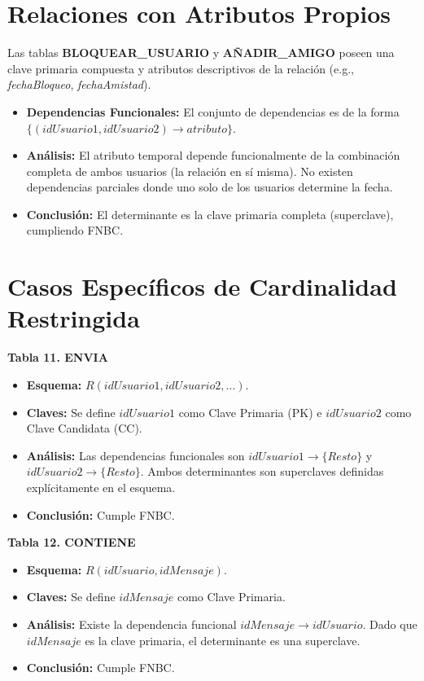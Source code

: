 \section*{Relaciones con Atributos Propios}
Las tablas \textbf{BLOQUEAR\_USUARIO} y \textbf{AÑADIR\_AMIGO} poseen una clave primaria compuesta y atributos descriptivos de la relación (e.g., \textit{fechaBloqueo}, \textit{fechaAmistad}).

\begin{itemize}
    \item \textbf{Dependencias Funcionales:} El conjunto de dependencias es de la forma $\{ (idUsuario1, idUsuario2) \to atributo \}$.
    \item \textbf{Análisis:} El atributo temporal depende funcionalmente de la combinación completa de ambos usuarios (la relación en sí misma). No existen dependencias parciales donde uno solo de los usuarios determine la fecha.
    \item \textbf{Conclusión:} El determinante es la clave primaria completa (superclave), cumpliendo FNBC.
\end{itemize}

\section*{Casos Específicos de Cardinalidad Restringida}

\textbf{Tabla 11. ENVIA}
\begin{itemize}
    \item \textbf{Esquema:} $R(idUsuario1, idUsuario2, \dots)$.
    \item \textbf{Claves:} Se define $idUsuario1$ como Clave Primaria (PK) e $idUsuario2$ como Clave Candidata (CC).
    \item \textbf{Análisis:} Las dependencias funcionales son $idUsuario1 \to \{Resto\}$ y $idUsuario2 \to \{Resto\}$. Ambos determinantes son superclaves definidas explícitamente en el esquema.
    \item \textbf{Conclusión:} Cumple FNBC.
\end{itemize}

\textbf{Tabla 12. CONTIENE}
\begin{itemize}
    \item \textbf{Esquema:} $R(idUsuario, idMensaje)$.
    \item \textbf{Claves:} Se define $idMensaje$ como Clave Primaria.
    \item \textbf{Análisis:} Existe la dependencia funcional $idMensaje \to idUsuario$. Dado que $idMensaje$ es la clave primaria, el determinante es una superclave.
    \item \textbf{Conclusión:} Cumple FNBC.
\end{itemize}
